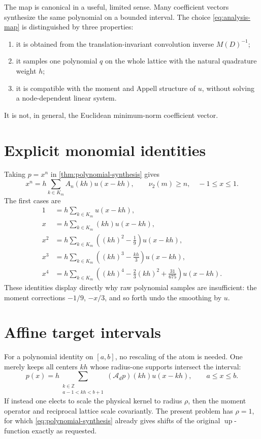 \documentclass[11pt,oneside]{book}
\theoremstyle{definition}
\theoremstyle{remark}
\newcommand{\Z}{\mathbb Z}
\newcommand{\Aop}{\mathcal A}
\newcommand{\vtwo}{\nu_2}
\begin{document}
The map is canonical in a useful, limited sense.  Many coefficient vectors synthesize the same polynomial on a bounded interval.  The choice \cref{eq:analysis-map} is distinguished by three properties:
\begin{enumerate}
\item it is obtained from the translation-invariant convolution inverse \(M(D)^{-1}\);
\item it samples one polynomial \(q\) on the whole lattice with the natural quadrature weight \(h\);
\item it is compatible with the moment and Appell structure of \(u\), without solving a node-dependent linear system.
\end{enumerate}
It is not, in general, the Euclidean minimum-norm coefficient vector.

\section{Explicit monomial identities}
Taking \(p=x^n\) in \cref{thm:polynomial-synthesis} gives
\begin{equation}
 x^n=h\sum_{k\in K_m}A_n(kh)u(x-kh),
 \qquad \vtwo(m)\ge n,
 \quad -1\le x\le1.
 \label{eq:monomial-synthesis}
\end{equation}
The first cases are
\begin{align}
 1&=h\sum_{k\in K_m}u(x-kh),\label{eq:constant-synthesis}\\
 x&=h\sum_{k\in K_m}(kh)u(x-kh),\label{eq:linear-synthesis}\\
 x^2&=h\sum_{k\in K_m}\left((kh)^2-\frac19\right)u(x-kh),\label{eq:quadratic-synthesis}\\
 x^3&=h\sum_{k\in K_m}\left((kh)^3-\frac{kh}{3}\right)u(x-kh),\label{eq:cubic-synthesis}\\
 x^4&=h\sum_{k\in K_m}\left((kh)^4-\frac23(kh)^2+\frac{31}{675}\right)u(x-kh).
 \label{eq:quartic-synthesis}
\end{align}
These identities display directly why raw polynomial samples are insufficient: the moment corrections \(-1/9\), \(-x/3\), and so forth undo the smoothing by \(u\).

\section{Affine target intervals}
For a polynomial identity on \([a,b]\), no rescaling of the atom is needed.  One merely keeps all centers \(kh\) whose radius-one supports intersect the interval:
\begin{equation}
 p(x)=h\sum_{\substack{k\in\Z\\ a-1<kh<b+1}}
 (\Aop_dp)(kh)u(x-kh),\qquad a\le x\le b.
 \label{eq:arbitrary-interval}
\end{equation}
If instead one elects to scale the physical kernel to radius \(\rho\), then the moment operator and reciprocal lattice scale covariantly.  The present problem has \(\rho=1\), for which \cref{eq:polynomial-synthesis} already gives shifts of the original \(\operatorname{up}\)-function exactly as requested.
\end{document}
